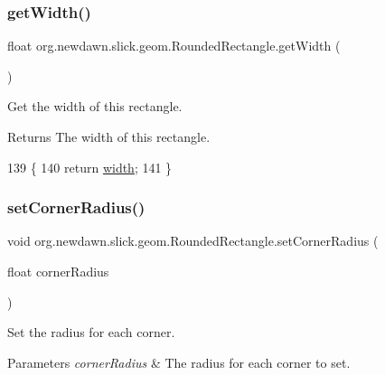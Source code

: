 \subsubsection{\texorpdfstring{get\+Width()}{getWidth()}}
{\footnotesize\ttfamily float org.\+newdawn.\+slick.\+geom.\+Rounded\+Rectangle.\+get\+Width (\begin{DoxyParamCaption}{ }\end{DoxyParamCaption})\hspace{0.3cm}{\ttfamily [inline]}}

Get the width of this rectangle.

\begin{DoxyReturn}{Returns}
The width of this rectangle. 
\end{DoxyReturn}

\begin{DoxyCode}
139                             \{
140         \textcolor{keywordflow}{return} \mbox{\hyperlink{classorg_1_1newdawn_1_1slick_1_1geom_1_1_rectangle_a967e1823f62daf45abb142779d1be62d}{width}};
141     \}
\end{DoxyCode}
\mbox{\label{classorg_1_1newdawn_1_1slick_1_1geom_1_1_rounded_rectangle_ae162e4106002812b304d28c76d45c08e}} 
\subsubsection{\texorpdfstring{set\+Corner\+Radius()}{setCornerRadius()}}
{\footnotesize\ttfamily void org.\+newdawn.\+slick.\+geom.\+Rounded\+Rectangle.\+set\+Corner\+Radius (\begin{DoxyParamCaption}\item[{float}]{corner\+Radius }\end{DoxyParamCaption})\hspace{0.3cm}{\ttfamily [inline]}}

Set the radius for each corner.


\begin{DoxyParams}{Parameters}
{\em corner\+Radius} & The radius for each corner to set. \\
\hline
\end{DoxyParams}

